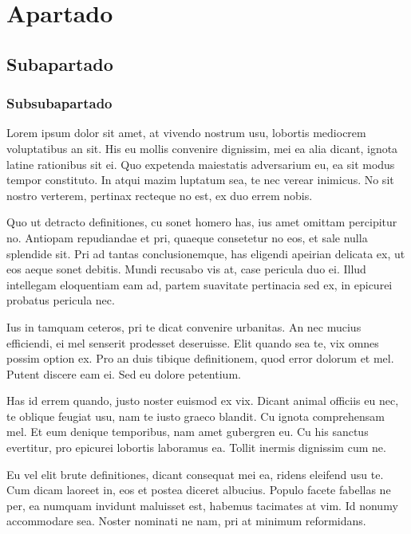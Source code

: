 \section{Apartado}
    \subsection{Subapartado}
        \subsubsection{Subsubapartado}
            Lorem ipsum dolor sit amet, at vivendo nostrum usu, lobortis mediocrem voluptatibus an sit.
            His eu mollis convenire dignissim, mei ea alia dicant, ignota latine rationibus sit ei. Quo
            expetenda maiestatis adversarium eu, ea sit modus tempor constituto. In atqui mazim luptatum
            sea, te nec verear inimicus. No sit nostro verterem, pertinax recteque no est, ex duo errem nobis.
            
            Quo ut detracto definitiones, cu sonet homero has, ius amet omittam percipitur no. Antiopam
            repudiandae et pri, quaeque consetetur no eos, et sale nulla splendide sit. Pri ad tantas
            conclusionemque, has eligendi apeirian delicata ex, ut eos aeque sonet debitis. Mundi recusabo
            vis at, case pericula duo ei. Illud intellegam eloquentiam eam ad, partem suavitate pertinacia sed
            ex, in epicurei probatus pericula nec.
            
            Ius in tamquam ceteros, pri te dicat convenire urbanitas. An nec mucius efficiendi, ei mel
            senserit prodesset deseruisse. Elit quando sea te, vix omnes possim option ex. Pro an duis tibique
            definitionem, quod error dolorum et mel. Putent discere eam ei. Sed eu dolore petentium.
            
            Has id errem quando, justo noster euismod ex vix. Dicant animal officiis eu nec, te oblique
            feugiat usu, nam te iusto graeco blandit. Cu ignota comprehensam mel. Et eum denique
            temporibus, nam amet gubergren eu. Cu his sanctus evertitur, pro epicurei lobortis laboramus ea.
            Tollit inermis dignissim cum ne.
            
            Eu vel elit brute definitiones, dicant consequat mei ea, ridens eleifend usu te. Cum dicam
            laoreet in, eos et postea diceret albucius. Populo facete fabellas ne per, ea numquam invidunt
            maluisset est, habemus tacimates at vim. Id nonumy accommodare sea. Noster nominati ne nam,
            pri at minimum reformidans.

